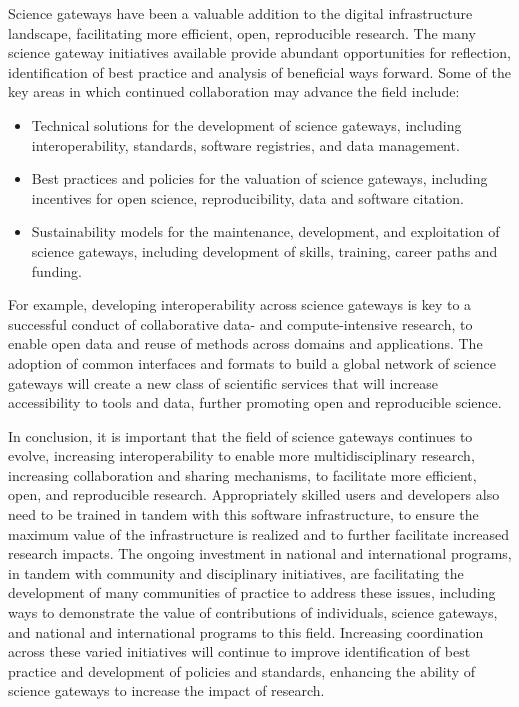 \documentclass[review]{elsarticle}
\begin{document}
Science gateways have been a valuable addition to the digital infrastructure landscape, facilitating more efficient, open, reproducible research. The many science gateway initiatives available provide abundant opportunities for reflection, identification of best practice and analysis of beneficial ways forward. Some of the key areas in which continued collaboration may advance the field include:
\begin{itemize}
	\item Technical solutions for the development of science gateways, including interoperability, standards, software registries, and data management.
	\item Best practices and policies for the valuation of science gateways, including incentives for open science, reproducibility, data and software citation.
	\item Sustainability models for the maintenance, development, and exploitation of science gateways, including development of skills, training, career paths and funding.
\end{itemize}

For example, developing interoperability across science gateways is key to a successful conduct of collaborative data- and compute-intensive research, to enable open data and reuse of methods across domains and applications. 
The adoption of common interfaces and formats to build a global network of science gateways will create a new class of scientific services that will increase accessibility to tools and data,  further promoting open and reproducible science. 


In conclusion, it is important that the field of science gateways continues to evolve, increasing interoperability to enable more multidisciplinary research, increasing collaboration and sharing mechanisms, to facilitate more efficient, open, and reproducible research. 
Appropriately skilled users and developers also need to be trained in tandem with this software infrastructure, to ensure the maximum value of the infrastructure is realized and to further facilitate increased research impacts. 
The ongoing investment in national and international programs, in tandem with community and disciplinary initiatives, are facilitating the development of many communities of practice to address these issues, including ways to demonstrate the value of contributions of individuals, science gateways, and national and international programs to this field. Increasing coordination across these varied initiatives will continue to improve identification of best practice and development of policies and standards, enhancing the ability of science gateways to increase the impact of research.
\end{document}
